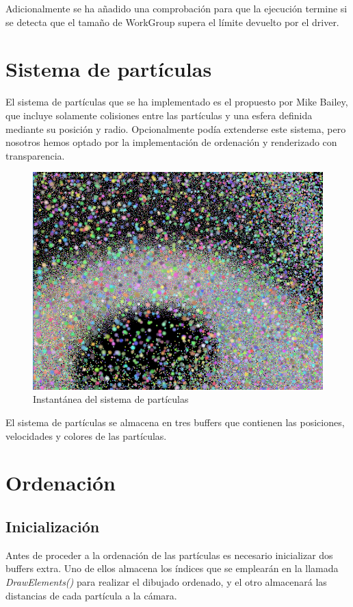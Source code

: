 \documentclass[10pt,oneside,a4paper]{article}
\begin{document}
Adicionalmente se ha añadido una comprobación para que la ejecución termine si se detecta que el tamaño de WorkGroup supera el límite devuelto por el driver.

\section{Sistema de partículas}
El sistema de partículas que se ha implementado es el propuesto por Mike Bailey, que incluye solamente colisiones entre las partículas y una esfera definida mediante su posición y radio. Opcionalmente podía extenderse este sistema, pero nosotros hemos optado por la implementación de ordenación y renderizado con transparencia.\\

\begin{figure}[h!tbp]
\centering
\includegraphics[width=.8\linewidth]{img/particles.png}
\caption{Instantánea del sistema de partículas}
\end{figure}

El sistema de partículas se almacena en tres buffers que contienen las posiciones, velocidades y colores de las partículas.

\section{Ordenación}
\subsection{Inicialización}
Antes de proceder a la ordenación de las partículas es necesario inicializar dos buffers extra. Uno de ellos almacena los índices que se emplearán en la llamada \textit{DrawElements()} para realizar el dibujado ordenado, y el otro almacenará las distancias de cada partícula a la cámara.\\
\end{document}
